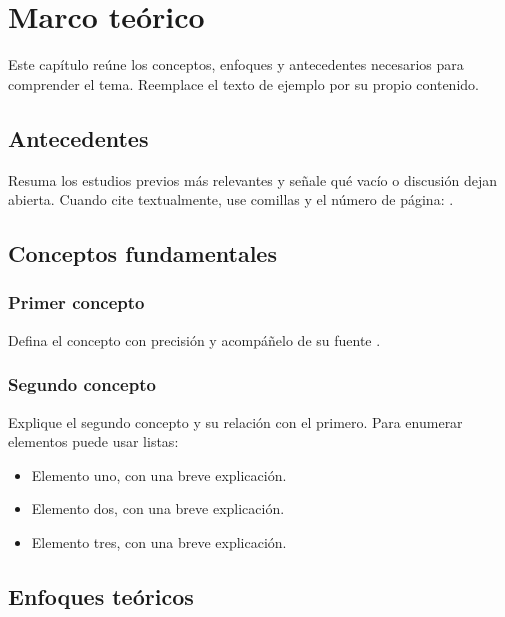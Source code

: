 \chapter{Marco teórico}
\label{cap:marco}

Este capítulo reúne los conceptos, enfoques y antecedentes necesarios para
comprender el tema. Reemplace el texto de ejemplo por su propio contenido.

\section{Antecedentes}
\label{sec:antecedentes}

Resuma los estudios previos más relevantes y señale qué vacío o discusión
dejan abierta. Cuando cite textualmente, use comillas y el número de página:
\citep[p.~25]{eco2001tesis}.

\section{Conceptos fundamentales}
\label{sec:conceptos}

\subsection{Primer concepto}

Defina el concepto con precisión y acompáñelo de su fuente
\citep{hernandez2014metodologia}.

\subsection{Segundo concepto}

Explique el segundo concepto y su relación con el primero. Para enumerar
elementos puede usar listas:

\begin{itemize}
  \item Elemento uno, con una breve explicación.
  \item Elemento dos, con una breve explicación.
  \item Elemento tres, con una breve explicación.
\end{itemize}

\section{Enfoques teóricos}
\label{sec:enfoques}

